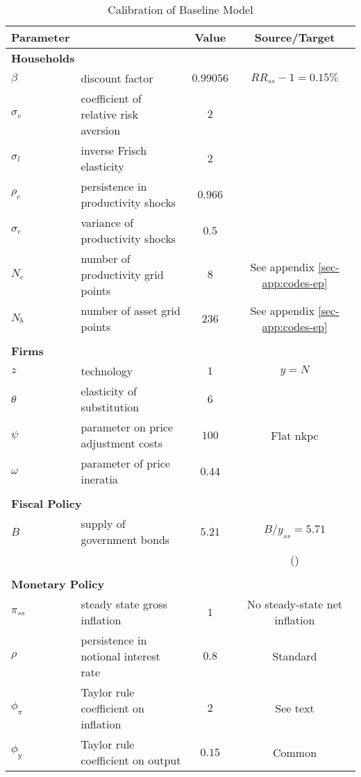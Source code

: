\documentclass[a4paper,12pt]{article} %
\numberwithin{equation}{section} %
\numberwithin{figure}{section}
\numberwithin{table}{section}
\begin{document}
\begin{table}[t]
\centering
\caption{Calibration of Baseline Model}
\label{tab:calibration-baseline}
\begin{tabular}{llcc}
Parameter &   &  Value & Source/Target \\
\hline
\hline
\multicolumn{2}{l}{\textbf{Households}} & & \\
$\beta$ &  discount factor & $0.99056$ & $RR_{ss}-1 = 0.15\%$ \\
$\sigma_c$ & coefficient of relative risk aversion & $2$ & \textcite{auclert2021} \\
$\sigma_l$ & inverse Frisch elasticity & $2$ & \textcite{auclert2021} \\
$\rho_e$ & persistence in productivity shocks & $0.966$ & \textcite{auclert2021} \\
$\sigma_e$ & variance of productivity shocks & $0.5$ & \textcite{auclert2021} \\
$N_e$ & number of productivity grid points & $8$ & See appendix \ref{sec-app:codes-ep} \\
$N_b$ & number of asset grid points & $236$ & See appendix \ref{sec-app:codes-ep} \\
& & & \\
\multicolumn{2}{l}{\textbf{Firms}} & & \\
$z$ &  technology & $1$ & $y=N$ \\
$\theta$ & elasticity of substitution & $6$ & \textcite{auclert2021} \\
$\psi$ & parameter on price adjustment costs & $100$ & Flat \Gls{nkpc} \\
$\omega$ & parameter of price ineratia & $0.44$ & \textcite{gust2017wp} \\
& & & \\
\multicolumn{2}{l}{\textbf{Fiscal Policy}} & & \\
$B$ & supply of government bonds & $5.21$ & $B/y_{ss} = 5.71$ \\
& & & (\cite{mckay2016}) \\
& & & \\
\multicolumn{2}{l}{\textbf{Monetary Policy}} & & \\
$\pi_{ss}$ & steady state gross inflation & $1$ & No steady-state net inflation \\
$\rho$ & persistence in notional interest rate & $0.8$ & Standard \\
$\phi_{\pi}$ & Taylor rule coefficient on inflation & $2$ & See text \\
$\phi_{y}$ & Taylor rule coefficient on output & $0.15$ & Common \\

\end{tabular}
\end{table}
\end{document}
